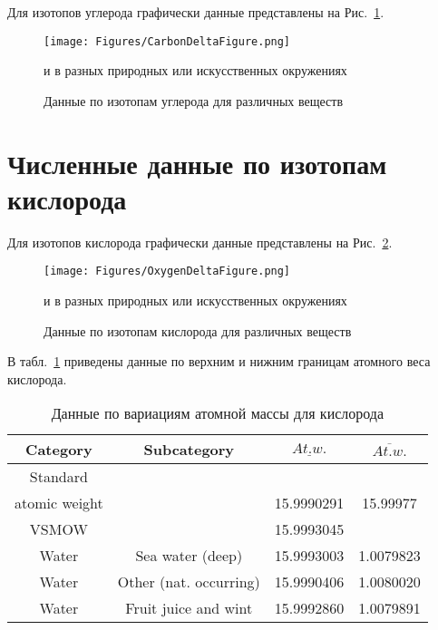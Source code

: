 \documentclass[a5paper,openany]{book}
\newcommand{\ov}{\overline}
\newcommand{\un}{\underline}
\begin{document}
Для изотопов  углерода графически данные представлены на Рис.~\ref{f:CarbonDeltaFigure}.
\begin{figure}[ht] 
	\centering\small
	\unitlength=1mm
	\texttt{[image: Figures/CarbonDeltaFigure.png]} 
	\caption{Данные по изотопам углерода для различных веществ} и в разных природных или искусственных  окружениях \cite{IUPACTables}
	\label{f:CarbonDeltaFigure}
\end{figure}


\section{Численные данные по изотопам кислорода} \label{IsotopeDataO}

Для изотопов кислорода графически данные представлены на Рис.~\ref{f:OxygenDeltaFigure}.
\begin{figure}[ht] 
	\centering\small
	\unitlength=1mm
	\texttt{[image: Figures/OxygenDeltaFigure.png]} 
	\caption{Данные по изотопам кислорода для различных веществ} и в разных природных или искусственных  окружениях \cite{IUPACTables}
	\label{f:OxygenDeltaFigure}
\end{figure}


В табл.~\ref{t:AtomicWeightO} приведены данные по верхним и нижним границам атомного веса кислорода.
\begin{table}[h]
	\centering
	{\footnotesize       
		\begin{tabular}{|c|c|c|c|}
			\hline
			Category &	Subcategory & $\un{At. w.}$	&  $\ov{At. w.}$ \\
			\hline
			Standard  & ~& ~ & ~    \\
			atomic weight & ~& 15.9990291 & 15.99977   \\
			\hline
			VSMOW & ~ & 15.9993045  & ~  \\
			\hline
			Water & Sea water (deep)& 15.9993003 & 1.0079823  \\
			Water  & Other (nat. occurring)& 15.9990406& 1.0080020  \\
			Water  & Fruit juice and wint& 15.9992860 & 1.0079891   \\ 
			\hline
		\end{tabular}
	}
	\caption{Данные по  вариациям атомной массы для кислорода}
	\label{t:AtomicWeightO}
\end{table}
\end{document}
